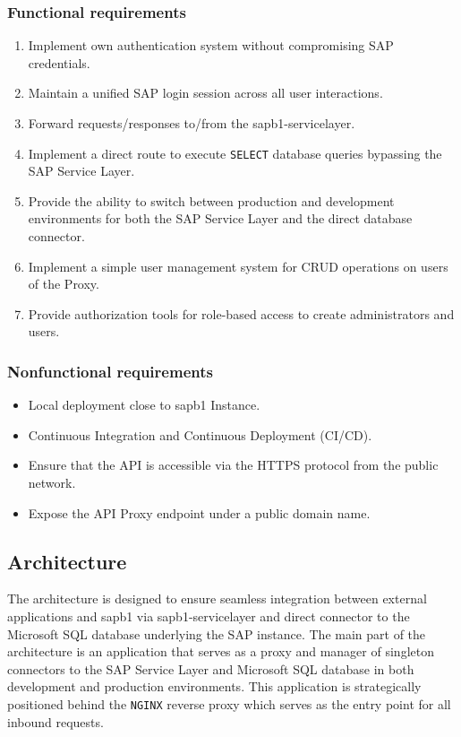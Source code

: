 \subsubsection{Functional requirements}
\label{subsubs:functional-requirements}
\begin{enumerate}[label=\bfseries \text{FR-SAP}\arabic*:,leftmargin=*]
    \item Implement own authentication system without compromising SAP credentials.
    \item Maintain a unified SAP login session across all user interactions.
    \item Forward requests/responses to/from the \gls{sapb1-servicelayer}.
    \item Implement a direct route to execute \texttt{SELECT} database queries bypassing the SAP Service Layer.
    \item Provide the ability to switch between production and development environments for both the SAP Service Layer and the direct database connector.
    \item Implement a simple user management system for CRUD operations on users of the Proxy.
    \item Provide authorization tools for role-based access to create administrators and users.
\end{enumerate}

\subsubsection{Nonfunctional requirements}
\label{subsubsec:nonfunctional-requirements}
\begin{itemize}
    \item Local deployment close to \gls{sapb1} Instance.
    \item Continuous Integration and Continuous Deployment (\ac{CI}/\ac{CD}).
    \item Ensure that the API is accessible via the HTTPS protocol from the public network.
    \item Expose the API Proxy endpoint under a public domain name.
\end{itemize}

\subsection{Architecture}
\label{subsec:architecture}
The architecture is designed to ensure seamless integration between external applications and \gls{sapb1} via \gls{sapb1-servicelayer} and direct connector to the Microsoft SQL database underlying the SAP instance. 
The main part of the architecture is an application that serves as a proxy and manager of singleton connectors to the SAP Service Layer and Microsoft SQL database in both development and production environments.
This application is strategically positioned behind the \texttt{NGINX} reverse proxy which serves as the entry point for all inbound requests.

